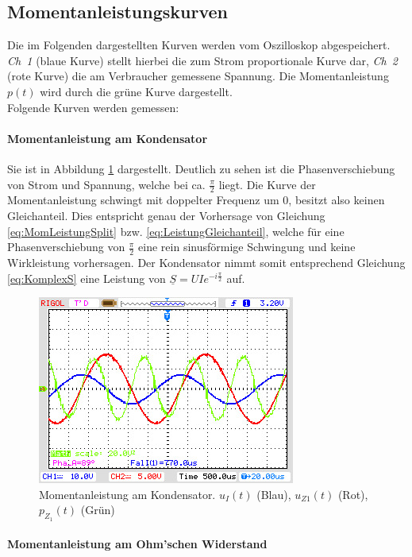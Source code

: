 \subsection{Momentanleistungskurven}

Die im Folgenden dargestellten Kurven werden vom Oszilloskop abgespeichert. \textit{Ch~1} (blaue Kurve) stellt hierbei die zum Strom proportionale Kurve dar, \textit{Ch~2} (rote Kurve) die am Verbraucher gemessene Spannung. Die Momentanleistung $p(t)$ wird durch die grüne Kurve dargestellt.
\\
Folgende Kurven werden gemessen:

\paragraph{Momentanleistung am Kondensator}
Sie ist in Abbildung \ref{fig:MomLKurveZ1} dargestellt. Deutlich zu sehen ist die Phasenverschiebung von Strom und Spannung, welche bei ca. $\frac{\pi}{2}$ liegt. Die Kurve der Momentanleistung schwingt mit doppelter Frequenz um 0, besitzt also keinen Gleichanteil. Dies entspricht genau der Vorhersage von Gleichung \eqref{eq:MomLeistungSplit} bzw. \eqref{eq:LeistungGleichanteil}, welche für eine Phasenverschiebung von $\frac{\pi}{2}$ eine rein sinusförmige Schwingung und keine Wirkleistung vorhersagen. Der Kondensator nimmt somit entsprechend Gleichung \eqref{eq:KomplexS} eine Leistung von $\underline{S} = UIe^{-i\frac{\pi}{2}}$ auf.\par

\begin{figure}[H]
\centering
\includegraphics[width=0.6\linewidth]{Oszi-Bitmaps/NewFile0.jpg}
\caption{Momentanleistung am Kondensator. $u_I(t)$ (Blau), $u_{Z1}(t)$ (Rot), $p_{Z_1}(t)$ (Grün)}
\label{fig:MomLKurveZ1}
\end{figure}

\paragraph{Momentanleistung am Ohm'schen Widerstand}


